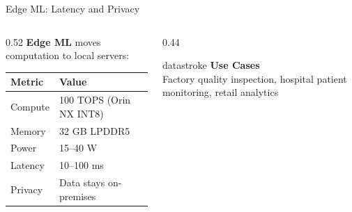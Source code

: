 \documentclass[aspectratio=169, 12pt]{beamer}
\begin{document}
\begin{frame}{Edge ML: Latency and Privacy}
\note{
%
%
%
%
}

\small
\begin{columns}[T]
  \begin{column}{0.52\textwidth}
    \textbf{Edge ML} moves computation to local servers:

    \vspace{0.15cm}
    {\footnotesize
    \renewcommand{\arraystretch}{1.15}
    \begin{tabular}{@{}ll@{}}
      \toprule
      \textbf{Metric} & \textbf{Value} \\
      \midrule
      Compute    & 100 TOPS (Orin NX INT8) \\
      Memory     & 32 GB LPDDR5 \\
      Power      & 15--40 W \\
      Latency    & 10--100 ms \\
      Privacy    & Data stays on-premises \\
      \bottomrule
    \end{tabular}
    }

    \vspace{0.15cm}
  \end{column}
  \begin{column}{0.44\textwidth}
    \vspace{0.2cm}
    \begin{mlsyscard}{datastroke}
    \textbf{Use Cases}\\
    {\footnotesize Factory quality inspection, hospital patient monitoring, retail analytics}
    \end{mlsyscard}


\end{column}
\end{columns}
\end{frame}
\end{document}
